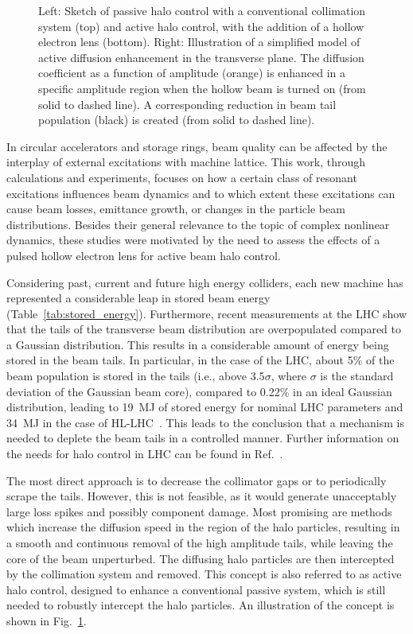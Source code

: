 \documentclass[aps
,prstab
,reprint
,longbibliography
,preprintnumbers
,showkeys
,amsfonts,amssymb,amsmath
,floatfix
]{revtex4-1}
\begin{document}
\begin{figure}
\begin{minipage}[c]{0.4\textwidth}
  \end{minipage}
  \hspace*{\fill}
  \caption{Left: Sketch of passive halo control with a conventional
    collimation system (top) and active halo control, with the
    addition of a hollow electron lens (bottom). Right: Illustration
    of a simplified model of active diffusion enhancement in the
    transverse plane. The diffusion coefficient as a function of
    amplitude (orange) is enhanced in a specific amplitude region when
    the hollow beam is turned on (from solid to dashed line). A
    corresponding reduction in beam tail population (black) is created
    (from solid to dashed line).}
  \label{fig:active_halo_control} 
\end{figure}

In circular accelerators and storage rings, beam quality can be
affected by the interplay of external excitations with machine
lattice. This work, through calculations and experiments, focuses on
how a certain class of resonant excitations influences beam dynamics
and to which extent these excitations can cause beam losses, emittance
growth, or changes in the particle beam distributions. Besides their
general relevance to the topic of complex nonlinear dynamics, these
studies were motivated by the need to assess the effects of a pulsed
hollow electron lens for active beam halo control.

Considering past, current and future high energy colliders, each new
machine has represented a considerable leap in stored beam energy
(Table~\ref{tab:stored_energy}). Furthermore, recent measurements at
the LHC show that the tails of the transverse beam distribution are
overpopulated compared to a Gaussian distribution. This results in a
considerable amount of energy being stored in the beam tails. In
particular, in the case of the LHC, about 5\% of the beam population
is stored in the tails (i.e., above 3.5$\sigma$, where $\sigma$ is the
standard deviation of the Gaussian beam core), compared to 0.22\% in
an ideal Gaussian distribution, leading to 19~MJ of stored energy for
nominal LHC parameters and 34~MJ in the case of
HL-LHC~\cite{helreview_valentino}. This leads to the conclusion that a
mechanism is needed to deplete the beam tails in a controlled
manner. Further information on the needs for halo control in LHC can
be found in Ref.~\cite{helreview}.

The most direct approach is to decrease the collimator gaps or to
periodically scrape the tails. However, this is not feasible, as it
would generate unacceptably large loss spikes and possibly component
damage. Most promising are methods which increase the diffusion speed
in the region of the halo particles, resulting in a smooth and
continuous removal of the high amplitude tails, while leaving the core
of the beam unperturbed. The diffusing halo particles are then
intercepted by the collimation system and removed. This concept is
also referred to as active halo control, designed to enhance a
conventional passive system, which is still needed to robustly
intercept the halo particles. An illustration of the concept is shown
in Fig.~\ref{fig:active_halo_control}.
\end{document}
